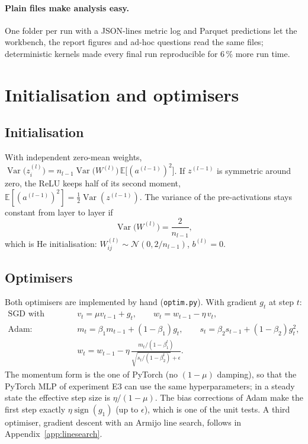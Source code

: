 \documentclass[11pt,a4paper]{article}
\newcommand{\1}{\mathbf{1}}
\begin{document}
\paragraph{Plain files make analysis easy.} One folder per run with a JSON-lines metric log and
Parquet predictions let the workbench, the report figures and ad-hoc questions read the same
files; deterministic kernels made every final run reproducible for 6\,\% more run time.

\clearpage
\appendix

\section{Initialisation and optimisers}
\label{app:optim}

\subsection{Initialisation}
With independent zero-mean weights, $\operatorname{Var}\bigl(z^{(l)}_i\bigr) = n_{l-1}
\operatorname{Var}\bigl(W^{(l)}\bigr) \, \mathbb{E}\bigl[(a^{(l-1)})^2\bigr]$. If $z^{(l-1)}$ is
symmetric around zero, the ReLU keeps half of its second moment,
$\mathbb{E}[(a^{(l-1)})^2] = \tfrac12 \operatorname{Var}(z^{(l-1)})$. The variance of the
pre-activations stays constant from layer to layer if
\begin{equation}
  \operatorname{Var}\bigl(W^{(l)}\bigr) = \frac{2}{n_{l-1}},
\end{equation}
which is He initialisation: $W^{(l)}_{ij} \sim \mathcal N(0, 2/n_{l-1})$, $b^{(l)} = 0$.

\subsection{Optimisers}
Both optimisers are implemented by hand (\texttt{optim.py}). With gradient $g_t$ at step $t$:
\begin{align}
  \text{SGD with momentum:} \quad & v_t = \mu v_{t-1} + g_t, \qquad
    w_t = w_{t-1} - \eta\, v_t, \\
  \text{Adam:} \quad & m_t = \beta_1 m_{t-1} + (1 - \beta_1) g_t, \qquad
    s_t = \beta_2 s_{t-1} + (1 - \beta_2) g_t^2, \\
  & w_t = w_{t-1} - \eta\, \frac{m_t / (1 - \beta_1^t)}{\sqrt{s_t / (1 - \beta_2^t)} + \epsilon}.
\end{align}
The momentum form is the one of PyTorch (no $(1-\mu)$ damping), so that the PyTorch MLP of
experiment E3 can use the same hyperparameters; in a steady state the effective step size is
$\eta / (1 - \mu)$. The bias corrections of Adam make the first step exactly
$\eta \operatorname{sign}(g_1)$ (up to $\epsilon$), which is one of the unit tests. A third optimiser, gradient descent with an Armijo
line search, follows in Appendix~\ref{app:linesearch}.
\end{document}
